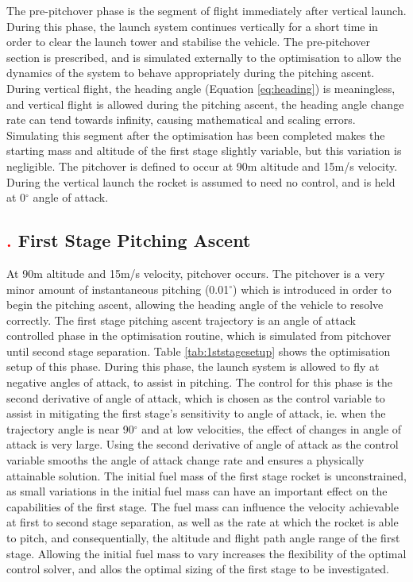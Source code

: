  The pre-pitchover phase is the segment of flight immediately after vertical launch. During this phase, the launch system continues vertically for a short time in order to clear the launch tower and stabilise the vehicle.        
The pre-pitchover section is prescribed, and is simulated externally to the optimisation to allow the dynamics of the system to behave appropriately during the pitching ascent. During vertical flight, the heading angle (Equation \ref{eq:heading}) is meaningless, and vertical flight is allowed during the pitching ascent, the heading angle change rate can tend towards infinity, causing mathematical and scaling errors. Simulating this segment after the optimisation has been completed makes the starting mass and altitude of the first stage slightly variable, but this variation is negligible. 
The pitchover is defined to occur at 90m altitude and 15m/s velocity.
During the vertical launch the rocket is assumed to need no control, and is held at 0$^\circ$ angle of attack. 

\subsection{\textcolor{red}{.} First Stage Pitching Ascent}

At 90m altitude and 15m/s velocity, pitchover occurs. The pitchover is a very minor amount of instantaneous pitching (0.01$^\circ$) which is introduced in order to begin the pitching ascent, allowing the heading angle of the vehicle to resolve correctly. 
The first stage pitching ascent trajectory is an angle of attack controlled phase in the optimisation routine, which is simulated from pitchover until second stage separation. Table \ref{tab:1ststagesetup} shows the optimisation setup of this phase. During this phase, the launch system is allowed to fly at negative angles of attack, to assist in pitching. The control for this phase is the second derivative of angle of attack, which is chosen as the control variable to assist in mitigating the first stage's sensitivity to angle of attack, ie. when the trajectory angle is near 90$^\circ$ and at low velocities, the effect of changes in angle of attack is very large. Using the second derivative of angle of attack as the control variable smooths the angle of attack change rate and ensures a physically attainable solution. 
The initial fuel mass of the first stage rocket is unconstrained, as small variations in the initial fuel mass can have an important effect on the capabilities of the first stage. The fuel mass can influence the velocity achievable at first to second stage separation, as well as the rate at which the rocket is able to pitch, and consequentially, the altitude and flight path angle range of the first stage.
Allowing the initial fuel mass to vary increases the flexibility of the optimal control solver, and allos the optimal sizing of the first stage to be investigated. 

